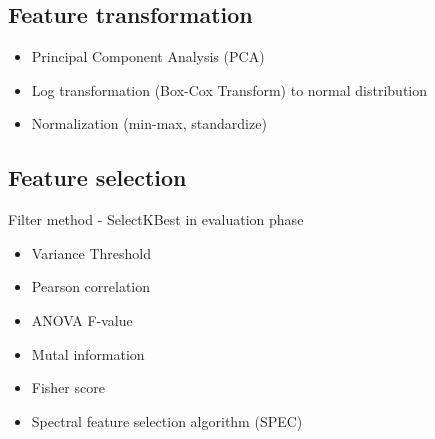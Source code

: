 \subsection{Feature transformation}
\begin{itemize}
\item Principal Component Analysis (PCA)
\item Log transformation (Box-Cox Transform) to normal distribution
\item Normalization (min-max, standardize) 
\end{itemize}

\subsection{Feature selection}
Filter method - SelectKBest  in evaluation phase
\begin{itemize}
\item Variance Threshold
\item Pearson correlation
\item ANOVA F-value
\item Mutal information
\item Fisher score
\item Spectral feature selection algorithm (SPEC)
\end{itemize} 
